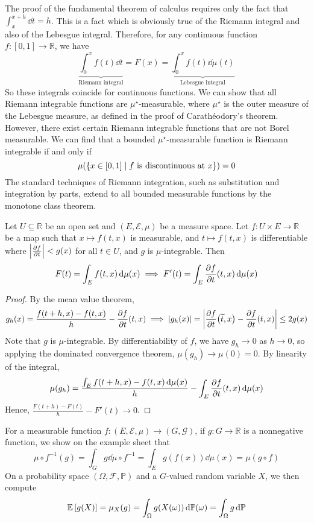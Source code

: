 \begin{remark}
	The proof of the fundamental theorem of calculus requires only the fact that \( \int_x^{x + h} \dd{t} = h \).
	This is a fact which is obviously true of the Riemann integral and also of the Lebesgue integral.
	Therefore, for any continuous function \( f \colon [0,1] \to \mathbb R \), we have
	\[ \underbrace{\int_0^x f(t) \dd{t}}_{\text{Riemann integral}} = F(x) = \underbrace{\int_0^x f(t) \dd{\mu(t)}}_{\text{Lebesgue integral}} \]
	So these integrals coincide for continuous functions.
	We can show that all Riemann integrable functions are \( \mu^\star \)-measurable, where \( \mu^\star \) is the outer measure of the Lebesgue measure, as defined in the proof of Carath\'eodory's theorem.
	However, there exist certain Riemann integrable functions that are not Borel measurable.
	We can find that a bounded \( \mu^\star \)-measurable function is Riemann integrable if and only if
	\[ \mu\qty(\qty{x \in [0,1] \mid f \text{ is discontinuous at } x}) = 0 \]
	The standard techniques of Riemann integration, such as substitution and integration by parts, extend to all bounded measurable functions by the monotone class theorem.
\end{remark}
\begin{theorem}
	Let \( U \subseteq \mathbb R \) be an open set and \( (E, \mathcal E, \mu) \) be a measure space.
	Let \( f \colon U \times E \to \mathbb R \) be a map such that \( x \mapsto f(t, x) \) is measurable, and \( t \mapsto f(t,x) \) is differentiable where \( \abs{\pdv{f}{t}} < g(x) \) for all \( t \in U \), and \( g \) is \( \mu \)-integrable.
	Then
	\[ F(t) = \int_E f(t,x) \dd{\mu(x)} \implies F'(t) = \int_E \pdv{f}{t}\qty(t,x) \dd{\mu(x)} \]
\end{theorem}
\begin{proof}
	By the mean value theorem,
	\[ g_h(x) = \frac{f(t + h, x) - f(t, x)}{h} - \pdv{f}{t}\qty(t,x) \implies \abs{g_h(x)} = \abs{\pdv{f}{t}\qty(\widetilde t, x) - \pdv{f}{t}\qty(t, x)} \leq 2g(x) \]
	Note that \( g \) is \( \mu \)-integrable.
	By differentiability of \( f \), we have \( g_h \to 0 \) as \( h \to 0 \), so applying the dominated convergence theorem, \( \mu(g_h) \to \mu(0) = 0 \).
	By linearity of the integral,
	\[ \mu(g_h) = \frac{\int_E f(t + h, x) - f(t, x) \dd{\mu(x)}}{h} - \int_E \pdv{f}{t}\qty(t,x) \dd{\mu(x)} \]
	Hence, \( \frac{F(t+h) - F(t)}{h} - F'(t) \to 0 \).
\end{proof}
\begin{example}
	For a measurable function \( f \colon (E, \mathcal E, \mu) \to (G, \mathcal G) \), if \( g \colon G \to \mathbb R \) is a nonnegative function, we show on the example sheet that
	\[ \mu \circ f^{-1}(g) = \int_G g \dd{\mu\circ f^{-1}} = \int_E g(f(x)) \dd{\mu(x)} = \mu(g \circ f) \]
	On a probability space \( (\Omega, \mathcal F, \mathbb P) \) and a \( G \)-valued random variable \( X \), we then compute
	\[ \mathbb{E}\left[{g(X)}\right] = \mu_X(g) = \int_\Omega g(X(\omega)) \dd{\mathbb P(\omega)} = \int_\Omega g \dd{\mathbb {P}} \]
\end{example}
